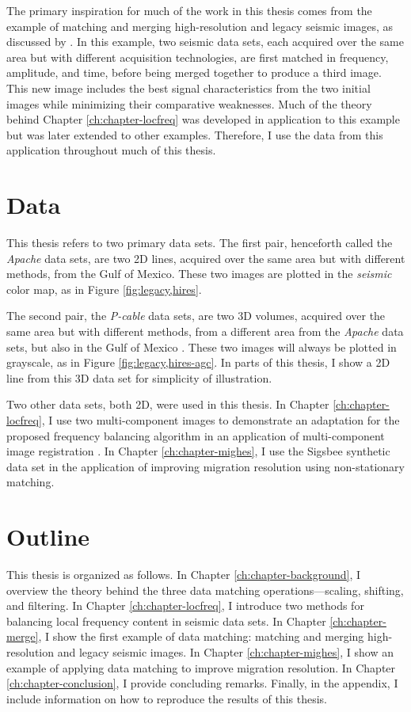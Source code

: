 The primary inspiration for much of the work in this thesis comes from the example of matching and merging high-resolution and legacy seismic images, as discussed by \cite{merge2, merge}.
In this example, two seismic data sets, each acquired over the same area but with different acquisition technologies, are first matched in frequency, amplitude, and time, before being merged together to produce a third image.
This new image includes the best signal characteristics from the two initial images while minimizing their comparative weaknesses.
Much of the theory behind Chapter \ref{ch:chapter-locfreq} was developed in application to this example but was later extended to other examples.
Therefore, I use the data from this application throughout much of this thesis.

\section{Data}
This thesis refers to two primary data sets. 
The first pair, henceforth called the {\it Apache} data sets, are two 2D lines, acquired over the same area but with different methods, from the Gulf of Mexico. 
These two images are plotted in the {\em seismic} color map, as in Figure \ref{fig:legacy,hires}.

The second pair, the {\em P-cable} data sets, are two 3D volumes, acquired over the same area but with different methods, from a different area from the {\em Apache} data sets, but also in the Gulf of Mexico \cite[]{pcable,data}.
These two images will always be plotted in grayscale, as in Figure \ref{fig:legacy,hires-agc}.
In parts of this thesis, I show a 2D line from this 3D data set for simplicity of illustration.

Two other data sets, both 2D, were used in this thesis. 
In Chapter \ref{ch:chapter-locfreq}, I use two multi-component images to demonstrate an adaptation for the proposed frequency balancing algorithm in an application of multi-component image registration \cite[]{attr}.
In Chapter \ref{ch:chapter-mighes}, I use the Sigsbee synthetic data set \cite[]{sigsbee} in the application of improving migration resolution using non-stationary matching.

\section{Outline}
This thesis is organized as follows.
In Chapter \ref{ch:chapter-background}, I overview the theory behind the three data matching operations---scaling, shifting, and filtering.
In Chapter \ref{ch:chapter-locfreq}, I introduce two methods for balancing local frequency content in seismic data sets.
In Chapter \ref{ch:chapter-merge}, I show the first example of data matching: matching and merging high-resolution and legacy seismic images.
In Chapter \ref{ch:chapter-mighes}, I show an example of applying data matching to improve migration resolution.
In Chapter \ref{ch:chapter-conclusion}, I provide concluding remarks.
Finally, in the appendix, I include information on how to reproduce the results of this thesis.

